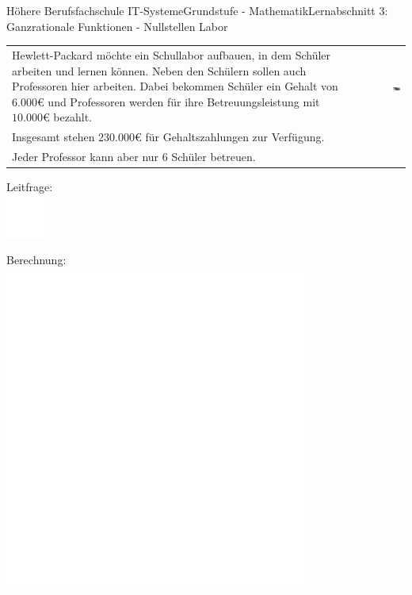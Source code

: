 \documentclass[oneside,openany,headings=optiontotoc,11pt,numbers=noenddot]{scrreprt}
\begin{document}
\begin{worksheet}{Höhere Berufsfachschule IT-Systeme}{Grundstufe - Mathematik}{Lernabschnitt 3: Ganzrationale Funktionen - Nullstellen}
		\setcounter{page}{1}
		\noindent
		\LARGE Labor\\
		\normalsize
		\noindent
		\begin{tabularx}{\textwidth}{Xr}
			\noindent
			Hewlett-Packard möchte ein Schullabor aufbauen, in dem Schüler arbeiten und lernen können. Neben den Schülern sollen auch Professoren hier arbeiten. Dabei bekommen Schüler ein Gehalt von \(6.000\)\euro{} und Professoren werden für ihre Betreuungsleistung mit \(10.000\)\euro{} bezahlt.& \includegraphics[width=0.15\textwidth,align=b]{../99_Bilder/comp.jpg}\\
			Insgesamt stehen \(230.000\)\euro{} für Gehaltszahlungen zur Verfügung.\\
			Jeder Professor kann aber nur 6 Schüler betreuen.\\			
		\end{tabularx}
		\begin{framed}
			\noindent
			\small{\color{codegray}Leitfrage:}\\
			\includegraphics[width=0.1\textwidth]{../../empty.jpg}\\
		\end{framed}
		\begin{framed}
			\noindent
			\small{\color{codegray}Berechnung:}\\
			\includegraphics[width=0.75\textwidth]{../../empty.jpg}

\end{framed}
\end{worksheet}
\end{document}
